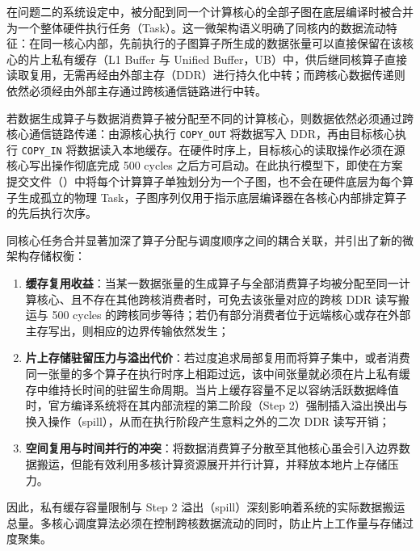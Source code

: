 \documentclass[anonymous,notoc]{gmcm2026}
\providecommand{\tightlist}{\setlength{\itemsep}{0pt}\setlength{\parskip}{0pt}}
\begin{document}
在问题二的系统设定中，被分配到同一个计算核心的全部子图在底层编译时被合并为一个整体硬件执行任务（Task）。这一微架构语义明确了同核内的数据流动特征：在同一核心内部，先前执行的子图算子所生成的数据张量可以直接保留在该核心的片上私有缓存（L1 Buffer 与 Unified Buffer，UB）中，供后继同核算子直接读取复用，无需再经由外部主存（DDR）进行持久化中转；而跨核心数据传递则依然必须经由外部主存通过跨核通信链路进行中转。

若数据生成算子与数据消费算子被分配至不同的计算核心，则数据依然必须通过跨核心通信链路传递：由源核心执行 \texttt{COPY\_OUT} 将数据写入 DDR，再由目标核心执行 \texttt{COPY\_IN} 将数据读入本地缓存。在硬件时序上，目标核心的读取操作必须在源核心写出操作彻底完成 500 cycles 之后方可启动。在此执行模型下，即使在方案提交文件（\texttt{}）中将每个计算算子单独划分为一个子图，也不会在硬件底层为每个算子生成孤立的物理 Task，子图序列仅用于指示底层编译器在各核心内部排定算子的先后执行次序。

同核心任务合并显著加深了算子分配与调度顺序之间的耦合关联，并引出了新的微架构存储权衡：

\begin{enumerate}
\def\labelenumi{\arabic{enumi}.}
\tightlist
\item
  \textbf{缓存复用收益}：当某一数据张量的生成算子与全部消费算子均被分配至同一计算核心、且不存在其他跨核消费者时，可免去该张量对应的跨核 DDR 读写搬运与 500 cycles 的跨核同步等待；若仍有部分消费者位于远端核心或存在外部主存写出，则相应的边界传输依然发生；
\item
  \textbf{片上存储驻留压力与溢出代价}：若过度追求局部复用而将算子集中，或者消费同一张量的多个算子在执行时序上相距过远，该中间张量就必须在片上私有缓存中维持长时间的驻留生命周期。当片上缓存容量不足以容纳活跃数据峰值时，官方编译系统将在其内部流程的第二阶段（Step 2）强制插入溢出换出与换入操作（spill），从而在执行阶段产生意料之外的二次 DDR 读写开销；
\item
  \textbf{空间复用与时间并行的冲突}：将数据消费算子分散至其他核心虽会引入边界数据搬运，但能有效利用多核计算资源展开并行计算，并释放本地片上存储压力。
\end{enumerate}

因此，私有缓存容量限制与 Step 2 溢出（spill）深刻影响着系统的实际数据搬运总量。多核心调度算法必须在控制跨核数据流动的同时，防止片上工作量与存储过度聚集。
\end{document}
